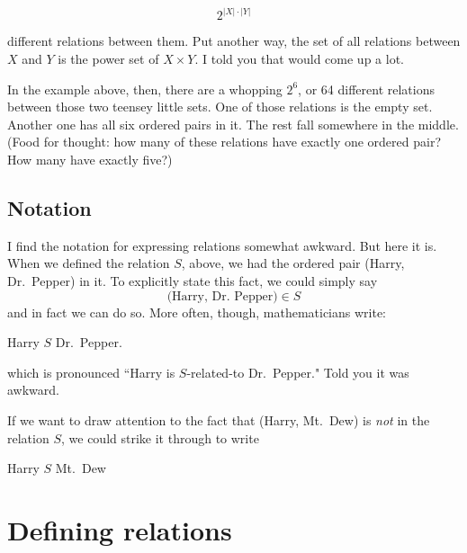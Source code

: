 \[
2^{|X|\cdot|Y|}
\]

different relations between them. Put another way, the set of all relations
between $X$ and $Y$ is the power set of $X \times Y$. I told you that would
come up a lot. 

In the example above, then, there are a whopping $2^6$, or 64 different
relations between those two teensey little sets. One of those relations is
the empty set. Another one has all six ordered pairs in it. The rest fall
somewhere in the middle. (Food for thought: how many of these relations
have exactly one ordered pair? How many have exactly five?)

\subsection{Notation}

I find the notation for expressing relations somewhat awkward. But here it
is. When we defined the relation $S$, above, we had the ordered pair
(Harry, Dr.~Pepper) in it. To explicitly state this fact, we could simply
say
\[
\text{(Harry, Dr.~Pepper)} \in S
\]
and in fact we can do so. More often, though, mathematicians write:
\begin{center}
Harry $S$ Dr.~Pepper.
\end{center}
which is pronounced ``Harry is $S$-related-to Dr.~Pepper." Told you it was
awkward.

If we want to draw attention to the fact that (Harry, Mt.~Dew) is
\textit{not} in the relation $S$, we could strike it through to write

\begin{center}
Harry \sout{$S$} Mt.~Dew
\end{center}

%
%
%
%


\section{Defining relations}

